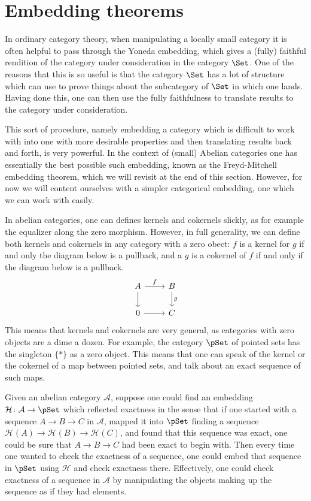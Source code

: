 \documentclass[main.tex]{subfiles}
\begin{document}
\section{Embedding theorems}
\label{sec:embedding_theorems}

In ordinary category theory, when manipulating a locally small category it is often helpful to pass through the Yoneda embedding, which gives a (fully) faithful rendition of the category under consideration in the category $\Set$. One of the reasons that this is so useful is that the category $\Set$ has a lot of structure which can use to prove things about the subcategory of $\Set$ in which one lands. Having done this, one can then use the fully faithfulness to translate results to the category under consideration.

This sort of procedure, namely embedding a category which is difficult to work with into one with more desirable properties and then translating results back and forth, is very powerful. In the context of (small) Abelian categories one has essentially the best possible such embedding, known as the Freyd-Mitchell embedding theorem, which we will revisit at the end of this section. However, for now we will content ourselves with a simpler categorical embedding, one which we can work with easily.

In abelian categories, one can defines kernels and cokernels slickly, as for example the equalizer along the zero morphism. However, in full generality, we can define both kernels and cokernels in any category with a zero obect: $f$ is a kernel for $g$ if and only the diagram below is a pullback, and a $g$ is a cokernel of $f$ if and only if the diagram below is a pullback.
\begin{equation*}
  \begin{tikzcd}
    A
    \arrow[r, "f"]
    \arrow[d]
    & B
    \arrow[d, "g"]
    \\
    0
    \arrow[r]
    & C
  \end{tikzcd}
\end{equation*}
This means that kernels and cokernels are very general, as categories with zero objects are a dime a dozen. For example, the category $\pSet$ of pointed sets has the singleton $\{*\}$ as a zero object. This means that one can speak of the kernel or the cokernel of a map between pointed sets, and talk about an exact sequence of such maps.

Given an abelian category $\mathcal{A}$, suppose one could find an embedding $\mathcal{H}\colon \mathcal{A} \to \pSet$ which reflected exactness in the sense that if one started with a sequence $A \to B \to C$ in $\mathcal{A}$, mapped it into $\pSet$ finding a sequence $\mathcal{H}(A) \to \mathcal{H}(B) \to \mathcal{H}(C)$, and found that this sequence was exact, one could be sure that $A \to B \to C$ had been exact to begin with. Then every time one wanted to check the exactness of a sequence, one could embed that sequence in $\pSet$ using $\mathcal{H}$ and check exactness there. Effectively, one could check exactness of a sequence in $\mathcal{A}$ by manipulating the objects making up the sequence as if they had elements.
\end{document}
